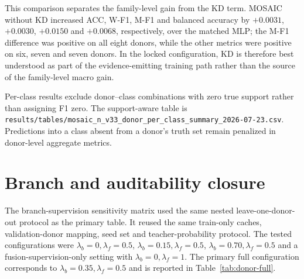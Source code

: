 \documentclass[10pt]{article}
\begin{document}
\begin{table}[H]
\centering
\caption{No-KD versus matched MLP paired donor audit. Differences are MOSAIC without KD minus the matched MLP after averaging seeds within each held-out donor. Balanced accuracy was reconstructed from supported per-class recalls for both methods.}
\label{tab:nokd-mlp-paired}
\small
\resizebox{\textwidth}{!}{%

}
\end{table}

This comparison separates the family-level gain from the KD term. MOSAIC without KD increased ACC, W-F1, M-F1 and balanced accuracy by $+0.0031$, $+0.0030$, $+0.0150$ and $+0.0068$, respectively, over the matched MLP; the M-F1 difference was positive on all eight donors, while the other metrics were positive on six, seven and seven donors. In the locked configuration, KD is therefore best understood as part of the evidence-emitting training path rather than the source of the family-level macro gain.

Per-class results exclude donor--class combinations with zero true support rather than assigning F1 zero. The support-aware table is
\texttt{results/tables/mosaic\_n\_v33\_donor\_per\_class\_summary\_2026-07-23.csv}.
Predictions into a class absent from a donor's truth set remain penalized in donor-level aggregate metrics.

\section{Branch and auditability closure}

The branch-supervision sensitivity matrix used the same nested leave-one-donor-out protocol as the primary table. It reused the same train-only caches, validation-donor mapping, seed set and teacher-probability protocol. The tested configurations were $\lambda_b=0,\lambda_f=0.5$, $\lambda_b=0.15,\lambda_f=0.5$, $\lambda_b=0.70,\lambda_f=0.5$ and a fusion-supervision-only setting with $\lambda_b=0,\lambda_f=1$. The primary full configuration corresponds to $\lambda_b=0.35,\lambda_f=0.5$ and is reported in Table~\ref{tab:donor-full}.

\begin{table}[H]
\centering
\caption{Branch-supervision sensitivity under the primary nested donor protocol. Values are donor means with 95\% confidence intervals after averaging three seeds within each donor.}
\label{tab:branch-supervision}
\scriptsize
\setlength{\tabcolsep}{2.8pt}
\resizebox{\textwidth}{!}{%

}
\end{table}
\end{document}
